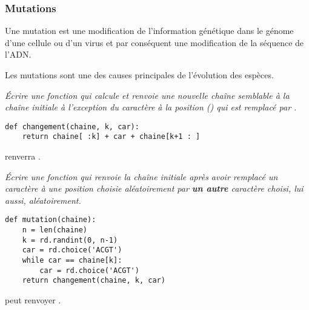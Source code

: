 \subsubsection{Mutations}
{\sf Une mutation est une modification de l'information génétique dans le génome d'une cellule ou d'un virus et par conséquent une modification de la séquence de l'ADN. 

Les mutations sont une des causes principales de l'évolution des espèces.} 
\begin{Exercise}\it 
Écrire une fonction  qui calcule et renvoie une nouvelle chaîne semblable à la chaîne initiale à l'exception du  caractère à la position  () qui est remplacé par .
\end{Exercise}
\begin{Answer}
\begin{lstlisting}
def changement(chaine, k, car):
    return chaine[ :k] + car + chaine[k+1 : ]
\end{lstlisting}
\end{Answer}
 renverra .
\begin{Exercise}\it 
Écrire une fonction  qui renvoie la chaîne initiale après avoir remplacé un caractère à une position choisie aléatoirement par {\bf un autre} caractère choisi, lui aussi, aléatoirement.
\end{Exercise}
\begin{Answer}
\begin{lstlisting}
def mutation(chaine):
    n = len(chaine)
    k = rd.randint(0, n-1)
    car = rd.choice('ACGT')
    while car == chaine[k]:
        car = rd.choice('ACGT')
    return changement(chaine, k, car)
\end{lstlisting}
\end{Answer}
 peut renvoyer .

